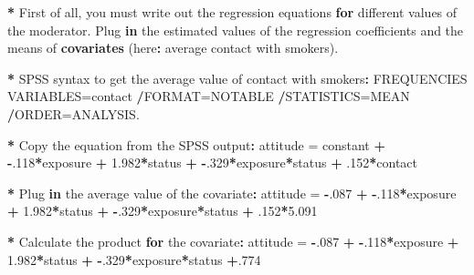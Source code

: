 \documentclass[a4paper]{book}
\newenvironment{Shaded}{\begin{snugshade}}{\end{snugshade}}
\newcommand{\KeywordTok}[1]{\textcolor[rgb]{0,0,0}{\textbf{#1}}}
\newcommand{\DecValTok}[1]{\textcolor[rgb]{0.00,0.00,0.00}{#1}}
\newcommand{\FloatTok}[1]{\textcolor[rgb]{0.00,0.00,0.00}{#1}}
\newcommand{\StringTok}[1]{\textcolor[rgb]{0.00,0.00,0.00}{#1}}
\newcommand{\ControlFlowTok}[1]{\textcolor[rgb]{0.00,0.00,0.00}{\textbf{#1}}}
\newcommand{\OperatorTok}[1]{\textcolor[rgb]{0.00,0.00,0.00}{\textbf{#1}}}
\newcommand{\NormalTok}[1]{#1}
\theoremstyle{definition}
\theoremstyle{definition}
\theoremstyle{definition}
\theoremstyle{remark}
\begin{document}
\begin{Shaded}
\begin{Highlighting}[]
\OperatorTok{*}\StringTok{ }\NormalTok{First of all, you must write out the regression equations }\ControlFlowTok{for}\NormalTok{ different}
\NormalTok{values of the moderator. Plug }\ControlFlowTok{in}\NormalTok{ the estimated values of the regression}
\NormalTok{coefficients and the means of }\KeywordTok{covariates}\NormalTok{ (here}\OperatorTok{:}\StringTok{ }\NormalTok{average contact with smokers).}

\OperatorTok{*}\StringTok{ }\NormalTok{SPSS syntax to get the average value of contact with smokers}\OperatorTok{:}
\NormalTok{FREQUENCIES VARIABLES=contact  }
 \OperatorTok{/}\NormalTok{FORMAT=NOTABLE  }
 \OperatorTok{/}\NormalTok{STATISTICS=MEAN  }
 \OperatorTok{/}\NormalTok{ORDER=ANALYSIS.  }

\OperatorTok{*}\StringTok{ }\NormalTok{Copy the equation from the SPSS output}\OperatorTok{:}\StringTok{  }
\NormalTok{attitude =}\StringTok{ }\NormalTok{constant }\OperatorTok{+}\StringTok{ }\OperatorTok{-}\NormalTok{.}\DecValTok{118}\OperatorTok{*}\NormalTok{exposure }\OperatorTok{+}\StringTok{ }\FloatTok{1.982}\OperatorTok{*}\NormalTok{status }\OperatorTok{+}\StringTok{ }\OperatorTok{-}\NormalTok{.}\DecValTok{329}\OperatorTok{*}\NormalTok{exposure}\OperatorTok{*}\NormalTok{status }\OperatorTok{+}\StringTok{ }\NormalTok{.}\DecValTok{152}\OperatorTok{*}\NormalTok{contact  }

\OperatorTok{*}\StringTok{ }\NormalTok{Plug }\ControlFlowTok{in}\NormalTok{ the average value of the covariate}\OperatorTok{:}\StringTok{ }
\NormalTok{attitude =}\StringTok{ }\OperatorTok{-}\NormalTok{.}\DecValTok{087} \OperatorTok{+}\StringTok{ }\OperatorTok{-}\NormalTok{.}\DecValTok{118}\OperatorTok{*}\NormalTok{exposure }\OperatorTok{+}\StringTok{ }\FloatTok{1.982}\OperatorTok{*}\NormalTok{status }\OperatorTok{+}\StringTok{ }\OperatorTok{-}\NormalTok{.}\DecValTok{329}\OperatorTok{*}\NormalTok{exposure}\OperatorTok{*}\NormalTok{status }\OperatorTok{+}\StringTok{ }\NormalTok{.}\DecValTok{152}\OperatorTok{*}\FloatTok{5.091}  

\OperatorTok{*}\StringTok{ }\NormalTok{Calculate the product }\ControlFlowTok{for}\NormalTok{ the covariate}\OperatorTok{:}
\NormalTok{attitude =}\StringTok{ }\OperatorTok{-}\NormalTok{.}\DecValTok{087} \OperatorTok{+}\StringTok{ }\OperatorTok{-}\NormalTok{.}\DecValTok{118}\OperatorTok{*}\NormalTok{exposure }\OperatorTok{+}\StringTok{ }\FloatTok{1.982}\OperatorTok{*}\NormalTok{status }\OperatorTok{+}\StringTok{ }\OperatorTok{-}\NormalTok{.}\DecValTok{329}\OperatorTok{*}\NormalTok{exposure}\OperatorTok{*}\NormalTok{status }\OperatorTok{+}\NormalTok{.}\DecValTok{774}  


\end{Highlighting}
\end{Shaded}
\end{document}
